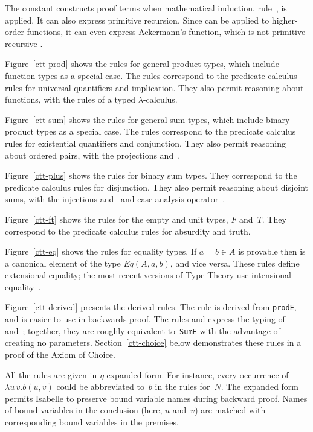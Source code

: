 The constant  constructs proof terms when mathematical
induction, rule~, is applied.  It can also express primitive
recursion.  Since  can be applied to higher-order functions,
it can even express Ackermann's function, which is not primitive recursive
\cite[page~104]{thompson91}.

Figure~\ref{ctt-prod} shows the rules for general product types, which
include function types as a special case.  The rules correspond to the
predicate calculus rules for universal quantifiers and implication.  They
also permit reasoning about functions, with the rules of a typed
$\lambda$-calculus.

Figure~\ref{ctt-sum} shows the rules for general sum types, which
include binary product types as a special case.  The rules correspond to the
predicate calculus rules for existential quantifiers and conjunction.  They
also permit reasoning about ordered pairs, with the projections
 and~.

Figure~\ref{ctt-plus} shows the rules for binary sum types.  They
correspond to the predicate calculus rules for disjunction.  They also
permit reasoning about disjoint sums, with the injections 
and~ and case analysis operator~.

Figure~\ref{ctt-ft} shows the rules for the empty and unit types, $F$
and~$T$.  They correspond to the predicate calculus rules for absurdity and
truth.

Figure~\ref{ctt-eq} shows the rules for equality types.  If $a=b\in A$ is
provable then  is a canonical element of the type $Eq(A,a,b)$,
and vice versa.  These rules define extensional equality; the most recent
versions of Type Theory use intensional equality~\cite{nordstrom90}.

Figure~\ref{ctt-derived} presents the derived rules.  The rule
 is derived from {\tt prodE}, and is easier to use
in backwards proof.  The rules  and 
express the typing of~ and~; together, they are
roughly equivalent to~{\tt SumE} with the advantage of creating no
parameters.  Section~\ref{ctt-choice} below demonstrates these rules in a
proof of the Axiom of Choice.

All the rules are given in $\eta$-expanded form.  For instance, every
occurrence of $\lambda u\,v. b(u,v)$ could be abbreviated to~$b$ in the
rules for~$N$.  The expanded form permits Isabelle to preserve bound
variable names during backward proof.  Names of bound variables in the
conclusion (here, $u$ and~$v$) are matched with corresponding bound
variables in the premises.


